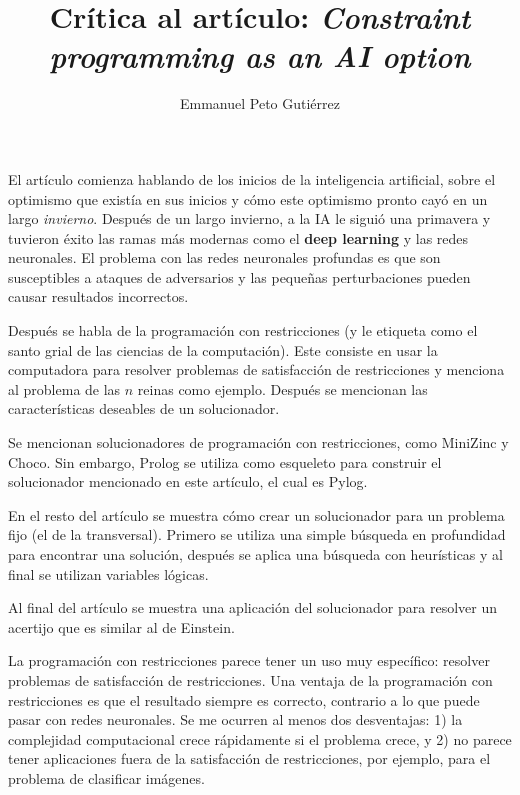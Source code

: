 \documentclass{article}
\title{Crítica al artículo: \textit{Constraint programming as an AI option}}
\author{Emmanuel Peto Gutiérrez}
\begin{document}
\maketitle

El artículo comienza hablando de los inicios de la inteligencia artificial, sobre el optimismo que existía en sus inicios y cómo este optimismo pronto cayó en un largo \textit{invierno}. Después de un largo invierno, a la IA le siguió una primavera y tuvieron éxito las ramas más modernas como el \textbf{deep learning} y las redes neuronales. El problema con las redes neuronales profundas es que son susceptibles a ataques de adversarios y las pequeñas perturbaciones pueden causar resultados incorrectos.

Después se habla de la programación con restricciones (y le etiqueta como el santo grial de las ciencias de la computación). Este consiste en usar la computadora para resolver problemas de satisfacción de restricciones y menciona al problema de las $n$ reinas como ejemplo. Después se mencionan las características deseables de un solucionador.

Se mencionan solucionadores de programación con restricciones, como MiniZinc y Choco. Sin embargo, Prolog se utiliza como esqueleto para construir el solucionador mencionado en este artículo, el cual es Pylog.

En el resto del artículo se muestra cómo crear un solucionador para un problema fijo (el de la transversal). Primero se utiliza una simple búsqueda en profundidad para encontrar una solución, después se aplica una búsqueda con heurísticas y al final se utilizan variables lógicas.

Al final del artículo se muestra una aplicación del solucionador para resolver un acertijo que es similar al de Einstein.

La programación con restricciones parece tener un uso muy específico: resolver problemas de satisfacción de restricciones. Una ventaja de la programación con restricciones es que el resultado siempre es correcto, contrario a lo que puede pasar con redes neuronales. Se me ocurren al menos dos desventajas: 1) la complejidad computacional crece rápidamente si el problema crece, y 2) no parece tener aplicaciones fuera de la satisfacción de restricciones, por ejemplo, para el problema de clasificar imágenes.
\end{document}
